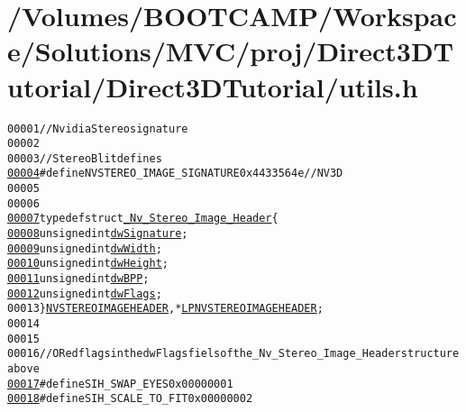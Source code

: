 \hypertarget{utils_8h_source}{
\section{/Volumes/BOOTCAMP/Workspace/Solutions/MVC/proj/Direct3DTutorial/Direct3DTutorial/utils.h}
}


\begin{footnotesize}\begin{alltt}
00001 \textcolor{comment}{// Nvidia Stereo signature}
00002 
00003 \textcolor{comment}{// Stereo Blitdefines}
\hypertarget{utils_8h_source_l00004}{}\hyperlink{utils_8h_a75d1758a6dea9bae825f3253943e334a}{00004} \textcolor{preprocessor}{#define NVSTEREO\_IMAGE\_SIGNATURE 0x4433564e //NV3D}
00005 \textcolor{preprocessor}{}
00006 
\hypertarget{utils_8h_source_l00007}{}\hyperlink{struct___nv___stereo___image___header}{00007} \textcolor{keyword}{typedef} \textcolor{keyword}{struct }\hyperlink{struct___nv___stereo___image___header}{_Nv_Stereo_Image_Header} \{
\hypertarget{utils_8h_source_l00008}{}\hyperlink{struct___nv___stereo___image___header_aac21b6be816ef3e6b98d1f1183263fd9}{00008}     \textcolor{keywordtype}{unsigned} \textcolor{keywordtype}{int} \hyperlink{struct___nv___stereo___image___header_aac21b6be816ef3e6b98d1f1183263fd9}{dwSignature};
\hypertarget{utils_8h_source_l00009}{}\hyperlink{struct___nv___stereo___image___header_a495218c0378e538de8c3504daa0a0846}{00009}     \textcolor{keywordtype}{unsigned} \textcolor{keywordtype}{int} \hyperlink{struct___nv___stereo___image___header_a495218c0378e538de8c3504daa0a0846}{dwWidth};
\hypertarget{utils_8h_source_l00010}{}\hyperlink{struct___nv___stereo___image___header_a72c1451aca7cb9c87540b647d51b25ad}{00010}     \textcolor{keywordtype}{unsigned} \textcolor{keywordtype}{int} \hyperlink{struct___nv___stereo___image___header_a72c1451aca7cb9c87540b647d51b25ad}{dwHeight};
\hypertarget{utils_8h_source_l00011}{}\hyperlink{struct___nv___stereo___image___header_a9a51ead5061c21601c50b0e1ee2be9a0}{00011}     \textcolor{keywordtype}{unsigned} \textcolor{keywordtype}{int} \hyperlink{struct___nv___stereo___image___header_a9a51ead5061c21601c50b0e1ee2be9a0}{dwBPP};
\hypertarget{utils_8h_source_l00012}{}\hyperlink{struct___nv___stereo___image___header_ad99da98f0c7e667408c3bba51ff5d047}{00012}     \textcolor{keywordtype}{unsigned} \textcolor{keywordtype}{int} \hyperlink{struct___nv___stereo___image___header_ad99da98f0c7e667408c3bba51ff5d047}{dwFlags};
00013 \} \hyperlink{struct___nv___stereo___image___header}{NVSTEREOIMAGEHEADER}, *\hyperlink{struct___nv___stereo___image___header}{LPNVSTEREOIMAGEHEADER};
00014 
00015 
00016 \textcolor{comment}{// ORedflags in the dwFlagsfielsof the \_Nv\_Stereo\_Image\_Headerstructure above}
\hypertarget{utils_8h_source_l00017}{}\hyperlink{utils_8h_a6d44bc2736224ee0c6a2a2993ff68fe4}{00017} \textcolor{preprocessor}{#define SIH\_SWAP\_EYES 0x00000001}
\hypertarget{utils_8h_source_l00018}{}\hyperlink{utils_8h_a6783bfb43af2b326cdf8ca43ffa47b5a}{00018} \textcolor{preprocessor}{}\textcolor{preprocessor}{#define SIH\_SCALE\_TO\_FIT 0x00000002}
\end{alltt}\end{footnotesize}
